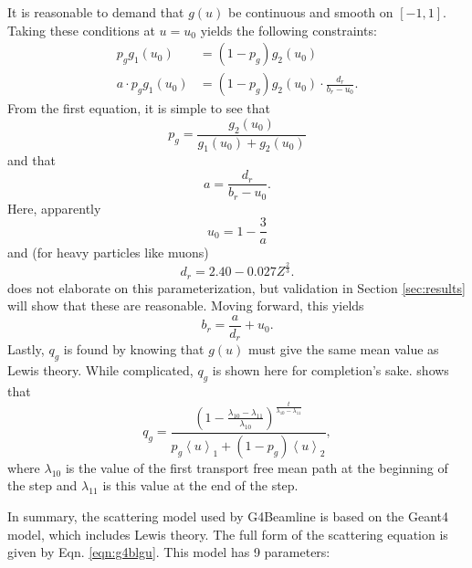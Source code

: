 It is reasonable to demand that $g(u)$ be continuous and smooth on $[-1,1]$. Taking these conditions at $u=u_0$ yields the following constraints:
%
\begin{align*}\nonumber
p_g g_1(u_0)&=(1-p_g)g_2(u_0)\\
a\cdot p_g g_1(u_0)&=(1-p_g)g_2(u_0)\cdot\frac{d_r}{b_r-u_0}.
\end{align*}
%
From the first equation, it is simple to see that
%
\begin{equation}
p_g=\frac{g_2(u_0)}{g_1(u_0)+g_2(u_0)}
\label{eqn:geantp}
\end{equation}
%
and that
%
\begin{equation}\nonumber
a=\frac{d_r}{b_r-u_0}.
\end{equation}
%
Here, apparently
\begin{equation}
u_0=1-\frac{3}{a}
\label{eqn:geantu0}
\end{equation}
%
and (for heavy particles like muons)
%
\begin{equation}
d_r=2.40-0.027Z^{\frac{2}{3}}.
\label{eqn:geantd}
\end{equation}
%
\cite{geant4} does not elaborate on this parameterization, but validation in Section \ref{sec:results} will show that these are reasonable. Moving forward, this yields
%
\begin{equation}
b_r=\frac{a}{d_r}+u_0.
\label{eqn:geantb}
\end{equation}
%
Lastly, $q_g$ is found by knowing that $g(u)$ must give the same mean value as Lewis theory. While complicated, $q_g$ is shown here for completion's sake. \cite{geant4} shows that
%
\begin{equation}
q_g=\frac{(1-\frac{\lambda_{10}-\lambda_{11}}{\lambda_{10}})^{\frac{t}{\lambda_{10}-\lambda_{11}}}}{p_g\left<u\right>_1+(1-p_g)\left<u\right>_2},
\label{eqn:geantq}
\end{equation}
where $\lambda_{10}$ is the value of the first transport free mean path at the beginning of the step and $\lambda_{11}$ is this value at the end of the step.

In summary, the scattering model used by G4Beamline is based on the Geant4 model, which includes Lewis theory. The full form of the scattering equation is given by Eqn. \ref{eqn:g4blgu}. This model has 9 parameters: 

